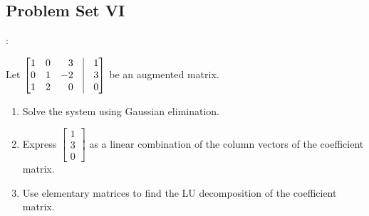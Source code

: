 \documentclass[../main.tex]{subfiles}
\begin{document}
\subsection{Problem Set VI}:
%
\begin{problem}
Let $\begin{bmatrix*}[r] 1 & 0 & 3 & \vline & 1 \\ 0 & 1 & -2 & \vline & 3 \\ 1 & 2 & 0 & \vline & 0 \end{bmatrix*}$ be an augmented matrix.
\begin{enumerate}
\item Solve the system using Gaussian elimination.
\item Express $\begin{bmatrix} 1 \\ 3 \\ 0\end{bmatrix}$ as a linear combination of the column vectors of the coefficient matrix.
\item Use elementary matrices to find the LU decomposition of the coefficient matrix.
\end{enumerate}
\end{problem}
\end{document}
